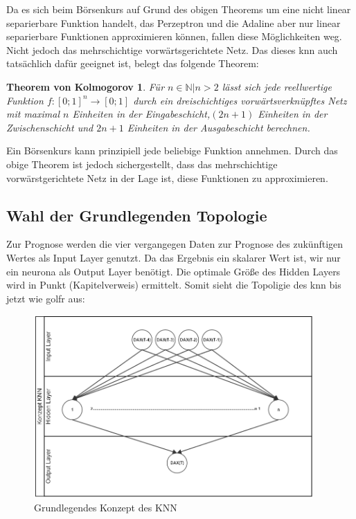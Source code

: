Da es sich beim Börsenkurs auf Grund des obigen Theorems um eine nicht linear separierbare Funktion handelt, das Perzeptron und die Adaline aber nur linear separierbare Funktionen approximieren können, fallen diese Möglichkeiten weg. Nicht jedoch das mehrschichtige vorwärtsgerichtete Netz. Das dieses \ac{knn} auch tatsächlich dafür geeignet ist, belegt das folgende Theorem:


\newtheorem*{theorem1*}{Theorem von Kolmogorov}
\begin{theorem1*}
Für ${n \in \mathbb{N} | n>2}$ lässt sich jede reellwertige Funktion $f:[0;1]^n\rightarrow[0;1]$ durch ein dreischichtiges vorwärtsverknüpftes Netz mit maximal $n$ Einheiten in der Eingabeschicht,$(2n+1)$ Einheiten in der Zwischenschicht und $2n+1$ Einheiten in der Ausgabeschicht berechnen.
\end{theorem1*}

Ein Börsenkurs kann prinzipiell jede beliebige Funktion annehmen. Durch das obige Theorem ist jedoch sichergestellt, dass das mehrschichtige vorwärstgerichtete Netz in der Lage ist, diese Funktionen zu approximieren.


\subsection{Wahl der Grundlegenden Topologie}
\label{subsection:Wahl Grundlegenden Topologie}

Zur Prognose werden die vier vergangegen Daten zur Prognose des zukünftigen Wertes als Input Layer genutzt. Da das Ergebnis ein skalarer Wert ist, wir nur ein neurona als Output Layer benötigt. Die optimale Größe des Hidden Layers wird in Punkt (Kapitelverweis) ermittelt. Somit sieht die Topoligie des knn bis jetzt wie golfr aus:

\begin{figure}[H]
\centering
		\includegraphics[width=0.95\textwidth]{KonzeptKNN.PNG}
	\caption{Grundlegendes Konzept des KNN}
	\label{fig:Grundlegendes Konzept des KNN}
\end{figure}

